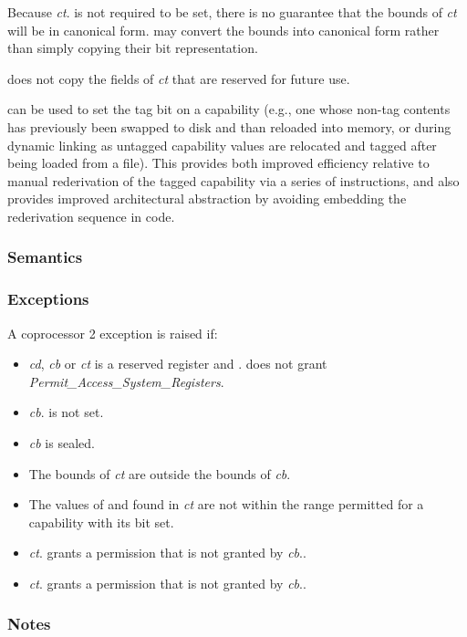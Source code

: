 Because \emph{ct}.\ctag{} is not required to be set, there is no guarantee
that the bounds of \emph{ct} will be in canonical form.
 may convert the bounds into canonical form rather than
simply copying their bit representation.

 does not copy the fields of \emph{ct} that are
reserved for future use.

 can be used to set the tag bit on a capability (e.g.,
one whose non-tag contents has previously been swapped to disk and than
reloaded into memory, or during dynamic linking as untagged capability values
are relocated and tagged after being loaded from a file).
This provides both improved efficiency relative to manual rederivation of the
tagged capability via a series of instructions, and also provides improved
architectural abstraction by avoiding embedding the rederivation sequence in
code.

\subsubsection*{Semantics}

\subsubsection*{Exceptions}

A coprocessor 2 exception is raised if:

\begin{itemize}
\item
\emph{cd}, \emph{cb} or \emph{ct} is a reserved register and \PCC.\cperms{} does
not grant \emph{Permit\_Access\_System\_Registers}.
\item
\emph{cb}.\ctag{} is not set.
\item
\emph{cb} is sealed.
\item
The bounds of \emph{ct} are outside the bounds of \emph{cb}.
\item
The values of \cbase{} and \clength{} found in \emph{ct} are not within the
range permitted for a capability with its \ctag{} bit set.
\item
\emph{ct}.\cperms{} grants a permission that is not granted by
\emph{cb}.\cperms{}.
\item
\emph{ct}.\cuperms{} grants a permission that is not granted by
\emph{cb}.\cuperms{}.
\end{itemize}

\subsubsection*{Notes}

